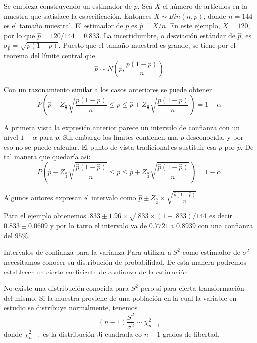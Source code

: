 \documentclass[
  10pt,
  ignorenonframetext,
]{beamer}
\begin{document}
\begin{frame}{}
\protect\hypertarget{section-17}{}
Se empieza construyendo un estimador de \(p\). Sea \(X\) el número de
artículos en la muestra que satisface la especificación. Entonces
\(X \sim Bin(n, p)\), donde \(n = 144\) es el tamaño muestral. El
estimador de \(p\) es \(\hat{p}= X/n\). En este ejemplo, \(X = 120\),
por lo que \(\hat{p}= 120/144 = 0.833\). La incertidumbre, o desviación
estándar de \(\hat{p}\), es \(\sigma_{\hat{p}}=\sqrt{p(1-p)}\). Puesto
que el tamaño muestral es grande, se tiene por el teorema del límite
central que \[\hat{p} \sim N\left(p,\frac{p(1-p)}{n}  \right) \]

Con un razonamiento similar a los casos anteriores se puede obtener
\[ P\left( \hat{p} -Z_{\frac{\alpha}{2} } \sqrt{\frac{p(1-p)}{n} } \le p \le \hat{p} + Z_{\frac{\alpha}{2} } \sqrt{\frac{p(1-p)}{n} }\right) =1- \alpha\]
\end{frame}

\begin{frame}{}
\protect\hypertarget{section-18}{}
A primera vista la expresión anterior parece un intervalo de confianza
con un nivel \(1-\alpha\) para \(p\). Sin embargo los límites contienen
una \(p\) desconocida, y por eso no se puede calcular. El punto de vista
tradicional es sustituir esa \(p\) por \(\hat{p}\). De tal manera que
quedaría así:
\[ P\left( \hat{p} -Z_{\frac{\alpha}{2} } \sqrt{\frac{ \hat{p}(1- \hat{p})}{n} } \le p \le \hat{p} + Z_{\frac{\alpha}{2} } \sqrt{\frac{ \hat{p}(1- \hat{p})}{n} }\right) =1- \alpha\]

Algunos autores expresan el intervalo como
\(\hat{p} \pm Z_\frac{\alpha}{2} \times \sqrt{\frac{\hat{p}(1-\hat{p})}{n}}\)

Para el ejemplo obtenemos
\(.833 \pm 1.96\times\sqrt{.833\times(1-.833)/144}\) es decir
\(0.833 \pm 0.0609\) y por lo tanto el intervalo va de \(0.7721\) a
\(0.8939\) con una confianza del \(95\%\).
\end{frame}

\begin{frame}{Intervalos de confianza para la varianza}
\protect\hypertarget{intervalos-de-confianza-para-la-varianza}{}
Para utilizar a \(S^2\) como estimador de \(\sigma^2\) necesitamos
conocer su distribución de probabilidad. De esta manera podremos
establecer un cierto coeficiente de confianza de la estimación.

No existe una distribución conocida para \(S^2\) pero sí para cierta
transformación del mismo. Si la muestra proviene de una población en la
cual la variable en estudio se distribuye normalmente, tenemos
\[(n-1)\frac{S^2}{\sigma^2} \sim \chi_{n-1}^2 \] donde \(\chi_{n-1}^2\)
es la distribución Ji-cuadrada co \(n-1\) grados de libertad.
\end{frame}
\end{document}
